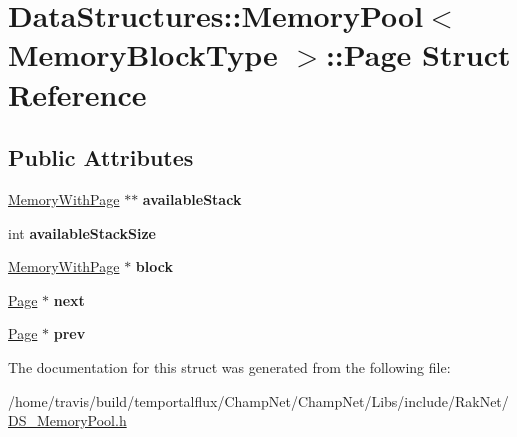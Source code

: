 \hypertarget{struct_data_structures_1_1_memory_pool_1_1_page}{\section{Data\-Structures\-:\-:Memory\-Pool$<$ Memory\-Block\-Type $>$\-:\-:Page Struct Reference}
\label{struct_data_structures_1_1_memory_pool_1_1_page}
}
\subsection*{Public Attributes}
\begin{DoxyCompactItemize}
\item 
\hypertarget{struct_data_structures_1_1_memory_pool_1_1_page_aa97069c8b1cb3eab18cb7372ebce194e}{\hyperlink{struct_data_structures_1_1_memory_pool_1_1_memory_with_page}{Memory\-With\-Page} $\ast$$\ast$ {\bfseries available\-Stack}}\label{struct_data_structures_1_1_memory_pool_1_1_page_aa97069c8b1cb3eab18cb7372ebce194e}

\item 
\hypertarget{struct_data_structures_1_1_memory_pool_1_1_page_a9ed832fd3129cc2f8fdcf775fb4dc594}{int {\bfseries available\-Stack\-Size}}\label{struct_data_structures_1_1_memory_pool_1_1_page_a9ed832fd3129cc2f8fdcf775fb4dc594}

\item 
\hypertarget{struct_data_structures_1_1_memory_pool_1_1_page_a4213ea092ba19f9510efe418ad98153e}{\hyperlink{struct_data_structures_1_1_memory_pool_1_1_memory_with_page}{Memory\-With\-Page} $\ast$ {\bfseries block}}\label{struct_data_structures_1_1_memory_pool_1_1_page_a4213ea092ba19f9510efe418ad98153e}

\item 
\hypertarget{struct_data_structures_1_1_memory_pool_1_1_page_a58387c1b1a6aedd52c78b0690ab49e50}{\hyperlink{struct_data_structures_1_1_memory_pool_1_1_page}{Page} $\ast$ {\bfseries next}}\label{struct_data_structures_1_1_memory_pool_1_1_page_a58387c1b1a6aedd52c78b0690ab49e50}

\item 
\hypertarget{struct_data_structures_1_1_memory_pool_1_1_page_afe2bf4d4b602697e6d91c7c8ef774e7c}{\hyperlink{struct_data_structures_1_1_memory_pool_1_1_page}{Page} $\ast$ {\bfseries prev}}\label{struct_data_structures_1_1_memory_pool_1_1_page_afe2bf4d4b602697e6d91c7c8ef774e7c}

\end{DoxyCompactItemize}


The documentation for this struct was generated from the following file\-:\begin{DoxyCompactItemize}
\item 
/home/travis/build/temportalflux/\-Champ\-Net/\-Champ\-Net/\-Libs/include/\-Rak\-Net/\hyperlink{_d_s___memory_pool_8h}{D\-S\-\_\-\-Memory\-Pool.\-h}\end{DoxyCompactItemize}
